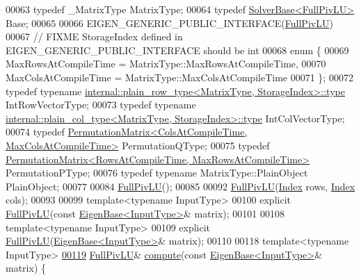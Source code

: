 \begin{DoxyCode}
00063     \textcolor{keyword}{typedef} \_MatrixType MatrixType;
00064     \textcolor{keyword}{typedef} \hyperlink{class_eigen_1_1_solver_base}{SolverBase<FullPivLU>} Base;
00065 
00066     EIGEN\_GENERIC\_PUBLIC\_INTERFACE(\hyperlink{group___l_u___module_class_eigen_1_1_full_piv_l_u}{FullPivLU})
00067     \textcolor{comment}{// FIXME StorageIndex defined in EIGEN\_GENERIC\_PUBLIC\_INTERFACE should be int}
00068     \textcolor{keyword}{enum} \{
00069       MaxRowsAtCompileTime = MatrixType::MaxRowsAtCompileTime,
00070       MaxColsAtCompileTime = MatrixType::MaxColsAtCompileTime
00071     \};
00072     \textcolor{keyword}{typedef} \textcolor{keyword}{typename} \hyperlink{class_eigen_1_1internal_1_1_tensor_lazy_evaluator_writable}{internal::plain\_row\_type<MatrixType, StorageIndex>::type}
       IntRowVectorType;
00073     \textcolor{keyword}{typedef} \textcolor{keyword}{typename} \hyperlink{class_eigen_1_1internal_1_1_tensor_lazy_evaluator_writable}{internal::plain\_col\_type<MatrixType, StorageIndex>::type}
       IntColVectorType;
00074     \textcolor{keyword}{typedef} \hyperlink{group___core___module}{PermutationMatrix<ColsAtCompileTime, MaxColsAtCompileTime>}
       PermutationQType;
00075     \textcolor{keyword}{typedef} \hyperlink{group___core___module}{PermutationMatrix<RowsAtCompileTime, MaxRowsAtCompileTime>}
       PermutationPType;
00076     \textcolor{keyword}{typedef} \textcolor{keyword}{typename} MatrixType::PlainObject PlainObject;
00077 
00084     \hyperlink{group___l_u___module_class_eigen_1_1_full_piv_l_u}{FullPivLU}();
00085 
00092     \hyperlink{group___l_u___module_class_eigen_1_1_full_piv_l_u}{FullPivLU}(\hyperlink{namespace_eigen_a62e77e0933482dafde8fe197d9a2cfde}{Index} rows, \hyperlink{namespace_eigen_a62e77e0933482dafde8fe197d9a2cfde}{Index} cols);
00093 
00099     \textcolor{keyword}{template}<\textcolor{keyword}{typename} InputType>
00100     \textcolor{keyword}{explicit} \hyperlink{group___l_u___module_class_eigen_1_1_full_piv_l_u}{FullPivLU}(\textcolor{keyword}{const} \hyperlink{group___core___module_struct_eigen_1_1_eigen_base}{EigenBase<InputType>}& matrix);
00101 
00108     \textcolor{keyword}{template}<\textcolor{keyword}{typename} InputType>
00109     \textcolor{keyword}{explicit} \hyperlink{group___l_u___module_class_eigen_1_1_full_piv_l_u}{FullPivLU}(\hyperlink{group___core___module_struct_eigen_1_1_eigen_base}{EigenBase<InputType>}& matrix);
00110 
00118     \textcolor{keyword}{template}<\textcolor{keyword}{typename} InputType>
\hyperlink{group___l_u___module_a0a3c3b1bbafa31a03567a4573ebabc79}{00119}     \hyperlink{group___l_u___module_class_eigen_1_1_full_piv_l_u}{FullPivLU}& \hyperlink{group___l_u___module_a0a3c3b1bbafa31a03567a4573ebabc79}{compute}(\textcolor{keyword}{const} \hyperlink{group___core___module_struct_eigen_1_1_eigen_base}{EigenBase<InputType>}& matrix) \{

\end{DoxyCode}
